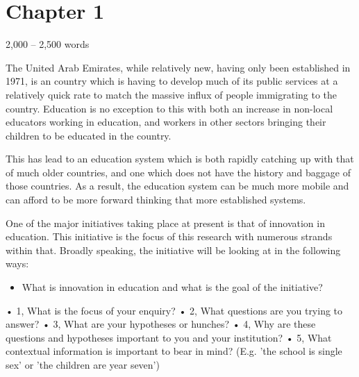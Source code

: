 \section{Chapter 1}
2,000 – 2,500 words

The United Arab Emirates, while relatively new, having only been established in 1971, is an country which is having to develop much of its public services at a relatively quick rate to match the massive influx of people immigrating to the country. Education is no exception to this with both an increase in non-local educators working in education, and workers in other sectors bringing their children to be educated in the country.

This has lead to an education system which is both rapidly catching up with that of much older countries, and one which does not have the history and baggage of those countries. As a result, the education system can be much more mobile and can afford to be more forward thinking that more established systems. 

One of the major initiatives taking place at present is that of innovation in education. This initiative is the focus of this research with numerous strands within that. Broadly speaking, the initiative will be looking at in the following ways: 

\begin{itemize}
\item What is innovation in education and what is the goal of the initiative?

\end{itemize}

•	1, What is the focus of your enquiry?
•	2, What questions are you trying to answer?
•	3, What are your hypotheses or hunches?
•	4, Why are these questions and hypotheses important to you and your institution?
•	5, What contextual information is important to bear in mind? (E.g. 'the school is single sex' or 'the children are year seven')
